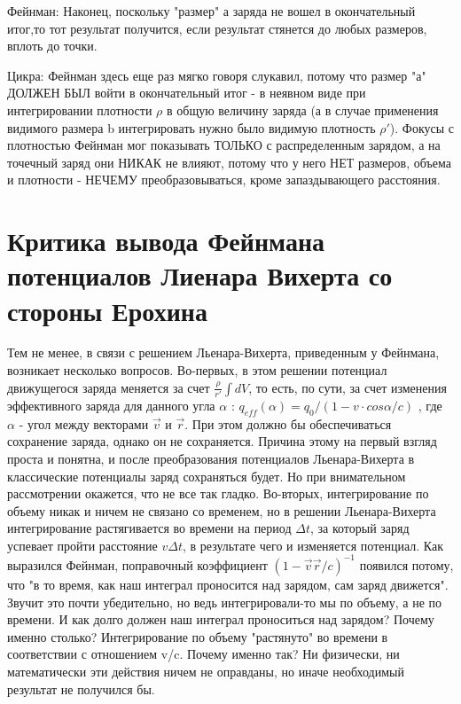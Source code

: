 \documentclass{article}
\begin{document}
Фейнман:
Наконец, поскольку "размер" а заряда не вошел в окончательный итог,то тот результат получится, если результат стянется до любых размеров, вплоть до точки.

Цикра:
Фейнман здесь еще раз мягко говоря слукавил, потому что размер "а" ДОЛЖЕН БЫЛ войти в окончательный итог - в неявном виде при интегрировании плотности $\rho$ в общую величину заряда (а в случае применения видимого размера b интегрировать нужно было видимую плотность $\rho'$).
Фокусы с плотностью Фейнман мог показывать ТОЛЬКО с распределенным зарядом, а на точечный заряд они НИКАК не влияют, потому что у него НЕТ размеров, объема и плотности - НЕЧЕМУ преобразовываться, кроме запаздывающего расстояния.

\section{Критика вывода Фейнмана потенциалов Лиенара Вихерта со стороны Ерохина \cite{erohin}}


Тем не менее, в связи с решением Льенара-Вихерта, приведенным у Фейнмана, возникает несколько вопросов.
Во-первых, в этом решении потенциал движущегося заряда меняется за счет $\frac{\rho}{r'}\int dV$, то есть, по сути, за счет изменения эффективного заряда для данного угла $\alpha$ :  $q_{eff}(\alpha) = q_0 / (1 - v \cdot cos \alpha/c)$ ,  где $\alpha$ - угол между векторами $\vec v$ и $\vec r$.  При этом должно бы обеспечиваться сохранение заряда, однако он не сохраняется. Причина этому на первый взгляд проста и понятна, и после преобразования потенциалов Льенара-Вихерта в классические потенциалы заряд сохраняться будет.  Но при внимательном рассмотрении окажется, что не все так гладко. 
Во-вторых, интегрирование по объему никак и ничем не связано со временем, но в решении Льенара-Вихерта интегрирование растягивается во времени на период $\Delta t$, за который заряд успевает пройти расстояние $v \Delta t$, в результате чего и изменяется потенциал. 
Как выразился Фейнман, поправочный коэффициент $(1 - \vec v \vec r/c)^{-1}$ появился потому, что "в то время, как наш интеграл проносится над зарядом, сам заряд движется".  Звучит это почти убедительно, но ведь интегрировали-то мы по объему, а не по времени. И как долго должен наш интеграл проноситься над зарядом? Почему именно столько?  Интегрирование по объему "растянуто" во времени в соответствии с отношением v/c. Почему именно так? Ни физически, ни математически эти действия ничем не оправданы, но иначе необходимый результат не получился бы. 
\end{document}
